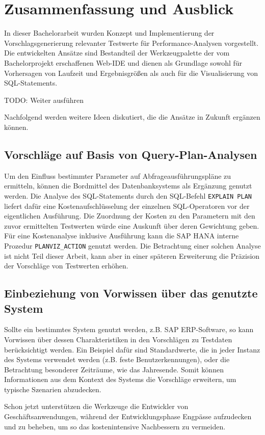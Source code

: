 \section{Zusammenfassung und Ausblick}\label{chap:conclusion}

In dieser Bachelorarbeit wurden Konzept und Implementierung der Vorschlagsgenerierung relevanter Testwerte für Performance-Analysen vorgestellt.
Die entwickelten Ansätze sind Bestandteil der Werkzeugpalette der vom Bachelorprojekt erschaffenen Web-IDE und dienen als Grundlage sowohl für Vorhersagen von Laufzeit und Ergebnisgrößen als auch für die Visualisierung von SQL-Statements.

TODO: Weiter ausführen

Nachfolgend werden weitere Ideen diskutiert, die die Ansätze in Zukunft ergänzen können.

\subsection{Vorschläge auf Basis von Query-Plan-Analysen}
Um den Einfluss bestimmter Parameter auf Abfrageausführungspläne zu ermitteln, können die Bordmittel des Datenbanksystems als Ergänzung genutzt werden.
Die Analyse des SQL-Statements durch den SQL-Befehl \texttt{EXPLAIN PLAN} liefert dafür eine Kostenaufschlüsselung der einzelnen SQL-Operatoren vor der eigentlichen Ausführung.
Die Zuordnung der Kosten zu den Parametern mit den zuvor ermittelten Testwerten würde eine Auskunft über deren Gewichtung geben.
Für eine Kostenanalyse inklusive Ausführung kann die SAP HANA interne Prozedur \texttt{PLANVIZ\_ACTION} genutzt werden.
Die Betrachtung einer solchen Analyse ist nicht Teil dieser Arbeit, kann aber in einer späteren Erweiterung die Präzision der Vorschläge von Testwerten erhöhen.

\subsection{Einbeziehung von Vorwissen über das genutzte System}
Sollte ein bestimmtes System genutzt werden, z.B. SAP ERP-Software, so kann Vorwissen über dessen Charakteristiken in den Vorschlägen zu Testdaten berücksichtigt werden.
Ein Beispiel dafür sind Standardwerte, die in jeder Instanz des Systems verwendet werden (z.B. feste Benutzerkennungen), oder die Betrachtung besonderer Zeiträume, wie das Jahresende.
Somit können Informationen aus dem Kontext des Systems die Vorschläge erweitern, um typische Szenarien abzudecken.


Schon jetzt unterstützen die Werkzeuge die Entwickler von Geschäftsanwendungen, während der Entwicklungsphase Engpässe aufzudecken und zu beheben, um so das kostenintensive Nachbessern zu vermeiden.